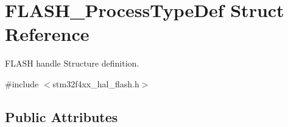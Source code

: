 \hypertarget{struct_f_l_a_s_h___process_type_def}{}\section{F\+L\+A\+S\+H\+\_\+\+Process\+Type\+Def Struct Reference}
\label{struct_f_l_a_s_h___process_type_def}


F\+L\+A\+SH handle Structure definition.  




{\ttfamily \#include $<$stm32f4xx\+\_\+hal\+\_\+flash.\+h$>$}

\subsection*{Public Attributes}
